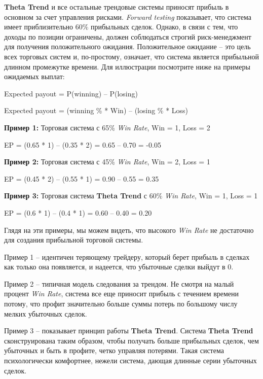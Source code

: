\documentclass[12pt,DIV=18]{scrartcl}
\begin{document}
\bigskip
 
\textbf{Theta Trend} и все остальные трендовые системы приносят прибыль в основном за счет управления рисками. \textit{Forward  testing} показывает, что система имеет приблизительно 60\% прибыльных сделок. Однако, в связи с тем, что доходы по позиции ограничены, должен соблюдаться строгий риск-менеджмент для получения положительного ожидания. Положительное ожидание -- это цель всех торговых систем и, по-простому, означает, что система является прибыльной длинном промежутке времени. Для иллюстрации посмотрите ниже на примеры ожидаемых выплат:
 
\bigskip
 
\setlength{\parindent}{0.5cm}
Expected payout = P(winning) -- P(losing)\par
Expected payout = (winning \% * Win) -- (losing \% * Loss)\par
\bigskip
\textbf{Пример 1:} Торговая система с 65\% \textit{Win Rate}, Win = 1, Loss = 2\par
\bigskip
EP = (0.65 * 1) -- (0.35 * 2) = 0.65 -- 0.70 = -0.05\par
\bigskip
\textbf{Пример 2:} Торговая система с 45\% \textit{Win Rate}, Win = 2, Loss = 1\par
\bigskip
EP = (0.45 * 2) -- (0.55 * 1) = 0.90 -- 0.55 = 0.35\par
\bigskip
\textbf{Пример 3:} Торговая система \textbf{Theta Trend} с 60\% \textit{Win Rate}, Win = 1, Loss = 1\par
\bigskip
EP = (0.6 * 1) -- (0.4 * 1) = 0.60 -- 0.40 = 0.20\par

\bigskip

Глядя на эти примеры, мы можем видеть, что высокого \textit{Win Rate} не достаточно для создания прибыльной торговой системы.
 
\bigskip
 
Пример 1 -- идентичен теряющему трейдеру, который берет прибыль в сделках как только она появляется, и надеется, что убыточные сделки выйдут в 0.

\bigskip
 
Пример 2 -- типичная модель следования за трендом. Не смотря на малый процент \textit{Win Rate}, система все еще приносит прибыль с течением времени потому, что профит значительно больше суммы потерь по большому числу мелких убыточных сделок.

\bigskip
 
Пример 3 -- показывает принцип работы \textbf{Theta Trend}. Система \textbf{Theta Trend} сконструирована таким образом, чтобы получать больше прибыльных сделок, чем убыточных и быть в профите, четко управляя потерями. Такая система психологически комфортнее, нежели система, дающая длинные серии убыточных сделок.
\end{document}
